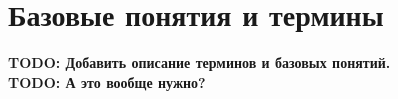 \section{Базовые понятия и термины}\label{sec:--anal--terms}
\textbf{TODO: Добавить описание терминов и базовых понятий.}\\
\textbf{TODO: А это вообще нужно?}
